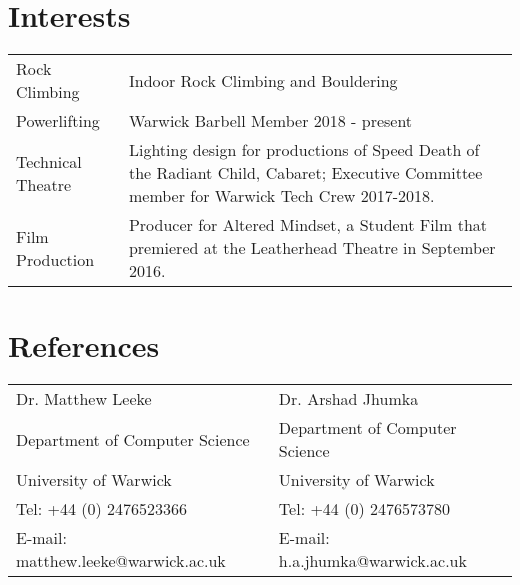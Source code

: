 \documentclass[11pt]{article}
\newcommand{\linesep}{\noindent\makebox[\linewidth]{\rule{\linewidth}{0.2pt}}}
\begin{document}
  \linesep

  \section*{Interests}
   \begin{center}
    \begin{tabularx}{\linewidth}{ X X }
Rock Climbing & Indoor Rock Climbing and Bouldering \\
Powerlifting & Warwick Barbell Member 2018 - present \\
Technical Theatre & Lighting design for productions of Speed Death of the Radiant
Child, Cabaret; Executive Committee member for Warwick Tech Crew 2017-2018.\\
Film Production & Producer for Altered Mindset, a Student Film that premiered at 
the Leatherhead Theatre in September 2016.
    \end{tabularx}
   \end{center}

  \linesep

   \section*{References}
     \begin{tabularx}{6.5in}{ X X }
Dr. Matthew Leeke & Dr. Arshad Jhumka \\
Department of Computer Science & Department of Computer Science \\
University of Warwick & University of Warwick \\
Tel: +44 (0) 2476523366 & Tel: +44 (0) 2476573780 \\
E-mail: matthew.leeke@warwick.ac.uk & E-mail: h.a.jhumka@warwick.ac.uk 
    \end{tabularx}
\end{document}
